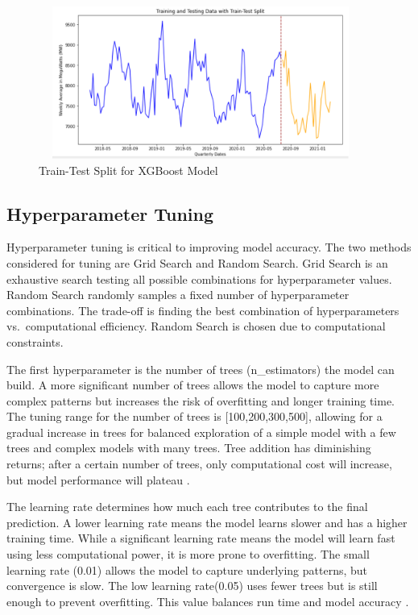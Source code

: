 \documentclass[mstat,12pt]{unswthesis}
\begin{document}
\begin{figure}[H]
\centering
\includegraphics[width=0.95\textwidth, height=5cm]{traintest.png}
\caption{Train-Test Split for XGBoost Model}\label{traintest}
\end{figure}

\subsection{Hyperparameter Tuning}\label{hyperparameter-tuning}

Hyperparameter tuning is critical to improving model accuracy. The two
methods considered for tuning are Grid Search and Random Search. Grid
Search is an exhaustive search testing all possible combinations for
hyperparameter values. Random Search randomly samples a fixed number of
hyperparameter combinations. The trade-off is finding the best
combination of hyperparameters vs.~computational efficiency. Random
Search is chosen due to computational constraints.

The first hyperparameter is the number of trees (n\_estimators) the
model can build. A more significant number of trees allows the model to
capture more complex patterns but increases the risk of overfitting and
longer training time. The tuning range for the number of trees is
{[}100,200,300,500{]}, allowing for a gradual increase in trees for
balanced exploration of a simple model with a few trees and complex
models with many trees. Tree addition has diminishing returns; after a
certain number of trees, only computational cost will increase, but
model performance will plateau \cite{a2022_xgboost}.

The learning rate determines how much each tree contributes to the final
prediction. A lower learning rate means the model learns slower and has
a higher training time. While a significant learning rate means the
model will learn fast using less computational power, it is more prone
to overfitting. The small learning rate (0.01) allows the model to
capture underlying patterns, but convergence is slow. The low learning
rate(0.05) uses fewer trees but is still enough to prevent overfitting.
This value balances run time and model accuracy \cite{a2022_xgboost}.
\end{document}
